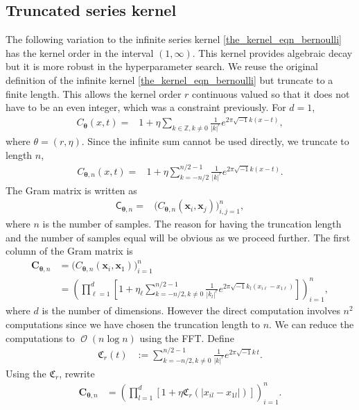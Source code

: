 \documentclass{svjour3}                     %
\DeclareMathOperator{\Order}{{\mathcal O}}
\newcommand{\bm}[1]{\boldsymbol{#1}}
\newcommand{\vtheta}{{\bm{\theta}}}
\newcommand{\vC}{\bm{C}}
\newcommand{\vx}{\bm{x}}
\newcommand{\mC}{\mathsf{C}}
\def\abs#1{\ensuremath{\left \lvert #1 \right \rvert}}
\begin{document}
\subsection{Truncated series kernel}
\label{sec:trunc_series_kernel}
The following variation to the infinite series kernel \eqref{the_kernel_eqn_bernoulli} has the kernel order in the interval $(1, \infty)$. This kernel provides algebraic decay but it is more robust in the hyperparameter search.
We reuse the original definition of the infinite kernel \eqref{the_kernel_eqn_bernoulli} but truncate to a finite length. This allows the kernel order $r$ continuous valued so that it does not have to be an even integer,  which was a constraint previously. 
For $d=1$,
\begin{align*}
C_\vtheta(x, t) = & 1 + \eta \sum_{k \in \mathbb{Z}, k \neq 0 } \frac{1}{\abs{k}^r} 
e^{ 2 \pi\sqrt{-1} k (x-t)},
\end{align*}
where $\theta = (r, \eta)$. 
Since the infinite sum cannot be used directly, we truncate to length $n$,
\begin{align*}
C_{\vtheta, n}(x, t) = & 1 + \eta \sum_{k = - n/2 }^{n/2 - 1} \frac{1}{\abs{k}^r} 
e^{ 2 \pi\sqrt{-1} k (x-t)}.
\end{align*}
The Gram matrix is written as 
\begin{align*}
\mC_{\vtheta, n} = & \biggl( C_{\vtheta, n}(\vx_i, \vx_j) \biggr)_{i,j=1}^n,
\end{align*}
where $n$ is the number of samples. 
The reason for having the truncation length and the number of samples equal will be obvious as we proceed further.
The first column of the Gram matrix is
\begin{align*}
\vC_{\vtheta, n} &= \biggl( C_{\vtheta, n}(\vx_i, \vx_1) \biggr)_{i=1}^n
\\
&= \left( \prod_{\ell=1}^d \left[ 1 + \eta_\ell \sum_{k = - n/2, k \neq 0 }^{n/2 - 1} \frac{1}{\abs{k_l}^r} 
e^{ 2 \pi\sqrt{-1} k_l (x_{i\ell}-x_{1\ell})}\right] \right)_{i=1}^n, 
\end{align*}
where $d$ is the number of dimensions. 
However the direct computation involves $n^2$ computations since we have chosen the truncation length to $n$. We can reduce the computations to $\Order(n\log n)$ using the FFT.
Define
\begin{align*}
\mathfrak{C}_r(t) &:= \sum_{k = - n/2, k \neq 0 }^{n/2 -1} \frac{1}{\abs{k}^r} 
e^{ 2 \pi\sqrt{-1} k\, t}.
\end{align*}
Using the $\mathfrak{C}_r$, rewrite
\begin{align}
\label{eqn:trunc_series_kernel}
\vC_{\vtheta, n}
&= \left( \prod_{l=1}^d \left[ 1 + \eta \mathfrak{C}_r( \abs{x_{il} - x_{1l}})\right] \right)_{i=1}^n.
\end{align}
\end{document}
